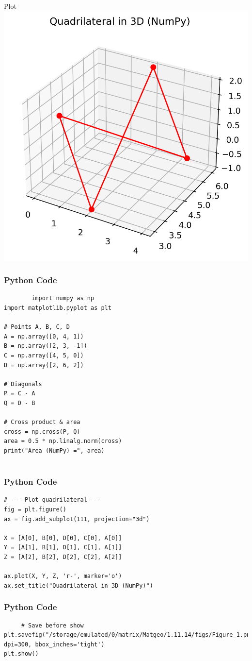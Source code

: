 \documentclass{beamer}
\begin{document}
\begin{frame}{Plot}
    \centering
    \includegraphics[width=\columnwidth, height=0.8\textheight, keepaspectratio]{figs/figure_1.png}     
\end{frame}

\begin{frame}[fragile]
    \frametitle{Python Code}
    \begin{lstlisting}
        import numpy as np
import matplotlib.pyplot as plt

# Points A, B, C, D
A = np.array([0, 4, 1])
B = np.array([2, 3, -1])
C = np.array([4, 5, 0])
D = np.array([2, 6, 2])

# Diagonals
P = C - A
Q = D - B

# Cross product & area
cross = np.cross(P, Q)
area = 0.5 * np.linalg.norm(cross)
print("Area (NumPy) =", area)


    \end{lstlisting}
\end{frame}

\begin{frame}[fragile]
    \frametitle{Python Code}
    \begin{lstlisting}
# --- Plot quadrilateral ---
fig = plt.figure()
ax = fig.add_subplot(111, projection="3d")

X = [A[0], B[0], D[0], C[0], A[0]]
Y = [A[1], B[1], D[1], C[1], A[1]]
Z = [A[2], B[2], D[2], C[2], A[2]]

ax.plot(X, Y, Z, 'r-', marker='o')
ax.set_title("Quadrilateral in 3D (NumPy)")

    \end{lstlisting}
\end{frame}

\begin{frame}[fragile]
    \frametitle{Python Code}
    \begin{lstlisting}
     # Save before show
plt.savefig("/storage/emulated/0/matrix/Matgeo/1.11.14/figs/Figure_1.png", dpi=300, bbox_inches='tight')
plt.show()   
    \end{lstlisting}
    
\end{frame}
\end{document}
